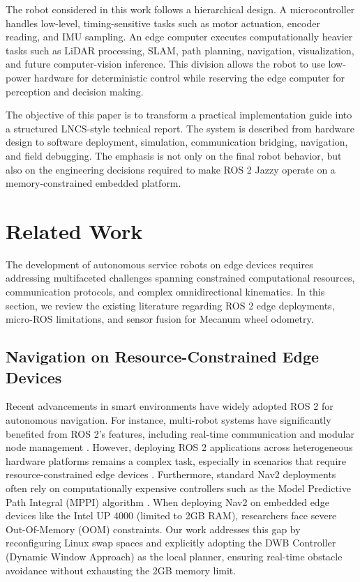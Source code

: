 \documentclass{llncs}
\begin{document}
The robot considered in this work follows a hierarchical design. A microcontroller handles low-level, timing-sensitive tasks such as motor actuation, encoder reading, and IMU sampling. An edge computer executes computationally heavier tasks such as LiDAR processing, SLAM, path planning, navigation, visualization, and future computer-vision inference. This division allows the robot to use low-power hardware for deterministic control while reserving the edge computer for perception and decision making.

The objective of this paper is to transform a practical implementation guide into a structured LNCS-style technical report. The system is described from hardware design to software deployment, simulation, communication bridging, navigation, and field debugging. The emphasis is not only on the final robot behavior, but also on the engineering decisions required to make ROS 2 Jazzy operate on a memory-constrained embedded platform.

\section{Related Work}
The development of autonomous service robots on edge devices requires addressing multifaceted challenges spanning constrained computational resources, communication protocols, and complex omnidirectional kinematics. In this section, we review the existing literature regarding ROS 2 edge deployments, micro-ROS limitations, and sensor fusion for Mecanum wheel odometry.

\subsection{Navigation on Resource-Constrained Edge Devices}
Recent advancements in smart environments have widely adopted ROS 2 for autonomous navigation. For instance, multi-robot systems have significantly benefited from ROS 2's features, including real-time communication and modular node management \cite{pmc_ros2_kubernetes_2025}. However, deploying ROS 2 applications across heterogeneous hardware platforms remains a complex task, especially in scenarios that require resource-constrained edge devices \cite{pmc_ros2_kubernetes_2025}. Furthermore, standard Nav2 deployments often rely on computationally expensive controllers such as the Model Predictive Path Integral (MPPI) algorithm \cite{nav2_dwb}. When deploying Nav2 on embedded edge devices like the Intel UP 4000 (limited to 2GB RAM), researchers face severe Out-Of-Memory (OOM) constraints. Our work addresses this gap by reconfiguring Linux swap spaces and explicitly adopting the DWB Controller (Dynamic Window Approach) as the local planner, ensuring real-time obstacle avoidance without exhausting the 2GB memory limit.
\end{document}
